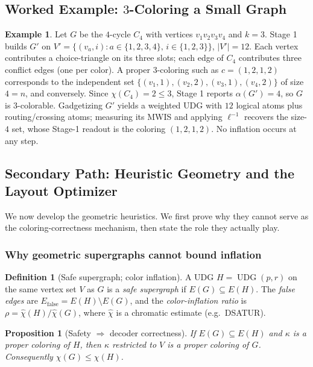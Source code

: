 \documentclass[11pt]{article}
\newtheorem{proposition}[theorem]{Proposition}
\theoremstyle{definition}
\newtheorem{definition}[theorem]{Definition}
\newtheorem{example}[theorem]{Example}
\theoremstyle{remark}
\newcommand{\UDG}{\operatorname{UDG}}
\newcommand{\Efalse}{E_{\mathrm{false}}}
\newcommand{\chihat}{\widehat{\chi}}
\newcommand{\indep}{\alpha}
\begin{document}
\subsection{Worked Example: $3$-Coloring a Small Graph}
\label{sec:gadget-example}

\begin{example}
Let $G$ be the $4$-cycle $C_4$ with vertices $v_1v_2v_3v_4$ and $k=3$. Stage 1 builds
$G'$ on $V'=\{(v_a,i): a\in\{1,2,3,4\},\,i\in\{1,2,3\}\}$, $|V'|=12$. Each vertex
contributes a choice-triangle on its three slots; each edge of $C_4$ contributes three
conflict edges (one per color). A proper $3$-coloring such as $c=(1,2,1,2)$ corresponds
to the independent set $\{(v_1,1),(v_2,2),(v_3,1),(v_4,2)\}$ of size $4=n$, and
conversely. Since $\chi(C_4)=2\le 3$, Stage 1 reports $\indep(G')=4$, so $G$ is
$3$-colorable. Gadgetizing $G'$ yields a weighted UDG with $12$ logical atoms plus
routing/crossing atoms; measuring its MWIS and applying $\ell^{-1}$ recovers the size-$4$
set, whose Stage-1 readout is the coloring $(1,2,1,2)$. No inflation occurs at any step.
\end{example}

\subsection{Secondary Path: Heuristic Geometry and the Layout Optimizer}
\label{sec:heuristics}

We now develop the geometric heuristics. We first prove why they cannot serve as the
coloring-correctness mechanism, then state the role they actually play.

\subsubsection{Why geometric supergraphs cannot bound inflation}
\label{sec:impossibility}

\begin{definition}[Safe supergraph; color inflation]
A UDG $H=\UDG(p,r)$ on the same vertex set $V$ as $G$ is a \emph{safe supergraph} if
$E(G)\subseteq E(H)$. The \emph{false edges} are $\Efalse=E(H)\setminus E(G)$, and the
\emph{color-inflation ratio} is $\rho = \chihat(H)/\chihat(G)$, where $\chihat$ is a
chromatic estimate (e.g.\ DSATUR).
\end{definition}

\begin{proposition}[Safety $\Rightarrow$ decoder correctness]
\label{prop:safety}
If $E(G)\subseteq E(H)$ and $\kappa$ is a proper coloring of $H$, then $\kappa$
restricted to $V$ is a proper coloring of $G$. Consequently $\chi(G)\le\chi(H)$.
\end{proposition}
\end{document}
